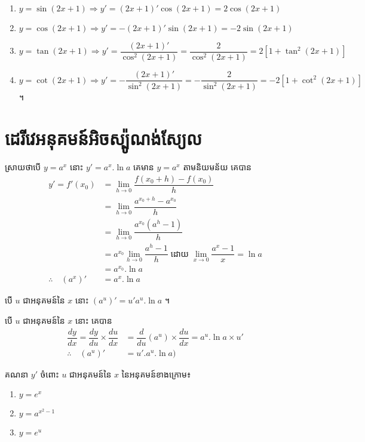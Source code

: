 \documentclass[a4paper,12pt]{article}
\begin{document}
\answer
\begin{enumerate}
	\item $y=\sin (2x+1) \Rightarrow y'=(2x+1)'\cos (2x+1)=2\cos (2x+1)$
	\item $y=\cos (2x+1)\Rightarrow y'=-(2x+1)'\sin (2x+1)=-2\sin (2x+1)$
	\item $y=\tan (2x+1)\Rightarrow y'=\dfrac{(2x+1)'}{\cos^2 (2x+1)}=\dfrac{2}{\cos^2 (2x+1)}=2[1+\tan^2(2x+1)]$
	\item $y=\cot (2x+1)\Rightarrow y'=-\dfrac{(2x+1)'}{\sin ^2 (2x+1)}=-\dfrac{2}{\sin^2 (2x+1)}=-2[1+\cot^2 (2x+1)]$ ។
\end{enumerate}
\section{ដេរីវេអនុគមន៍អិចស្ប៉ូណង់ស្យែល}
ស្រាយថាបើ $y=a^x$ នោះ $y'=a^x .\ln a$
\solution
គេមាន $y=a^x$ តាមនិយមន័យ គេបាន
\begin{align*}
	y'=f'(x_0)              & =\lim_{h\to 0}\dfrac{f(x_0+h)-f(x_0)}{h}                                                \\
	                        & =\lim_{h\to 0}\dfrac{a^{x_0+h}-a^{x_0}}{h}                                              \\
	                        & =\lim_{h\to 0}\dfrac{a^{x_0}(a^h-1)}{h}                                                 \\
	                        & =a^{x_0}\lim_{h\to 0}\dfrac{a^h-1}{h}\;\text{ដោយ}\; \lim_{x\to 0}\dfrac{a^x-1}{x}=\ln a \\
	                        & =a^{x_0}.\ln a                                                                          \\
	\therefore \quad (a^x)' & =a^x. \ln a
\end{align*}
\begin{general}
	បើ $u$ ជាអនុគមន៍នៃ $x$ នោះ $(a^u)'=u'a^u.\ln a$ ។
\end{general}
\solution
បើ $u$ ជាអនុគមន៍នៃ $x$ នោះ  គេបាន
\begin{align*}
	\dfrac{dy}{dx}=\dfrac{dy}{du}\times \dfrac{du}{dx} & =\dfrac{d}{du}(a^u)\times \dfrac{du}{dx}=a^u.\ln a \times u' \\
	\therefore \quad (a^u)'                            & =u'.a^u .\ln a)
\end{align*}
\begin{example}
	គណនា $y'$ ចំពោះ $u$ ជាអនុគមន៍នៃ $x$ នៃអនុគមន៍ខាងក្រោម៖
	\begin{multicols}{3}
		\begin{enumerate}
			\item $y=e^x$
			\item $y=a^{x^2-1}$
			\item $y=e^u$
		\end{enumerate}
	\end{multicols}
\end{example}
\end{document}
